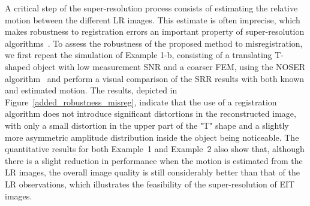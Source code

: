 \documentclass[10pt]{IEEEtran}
\begin{document}
A critical step of the super-resolution process consists of estimating the relative motion between the different LR images. This estimate is often imprecise, which makes robustness to registration errors an important property of super-resolution algorithms~\cite{Nasrollahi14}.
%
To assess the robustness of the proposed method to misregistration, we first repeat the simulation of Example 1-b, consisting of a translating T-shaped object with low measurement SNR and a coarser FEM, using the NOSER algorithm~\cite{Cheney1990noser} and perform a visual comparison of the SRR results with both known and estimated motion.
%
The results, depicted in Figure~\ref{added_robustness_misreg}, indicate that the use of a registration algorithm does not introduce significant distortions in the reconstructed image, with only a small distortion in the upper part of the "T" shape and a slightly more asymmetric amplitude distribution inside the object being noticeable.
%
The quantitative results for both Example~1 and Example~2 also show that, although there is a slight reduction in performance when the motion is estimated from the LR images, the overall image quality is still considerably better than that of the LR observations, which illustrates the feasibility of the super-resolution of EIT images.
\end{document}
